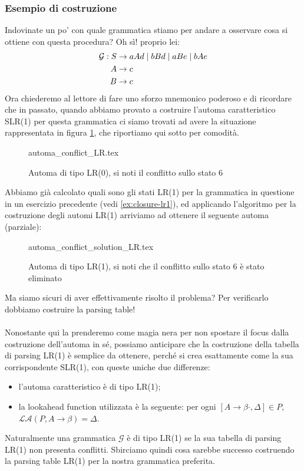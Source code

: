 \documentclass[class=book, crop=false, oneside, 12pt]{standalone}
\begin{document}
\subsubsection{Esempio di costruzione}
Indovinate un po' con quale grammatica stiamo per andare a osservare cosa si ottiene con questa procedura? Oh sì! proprio lei:
\begin{align}
    \label{eq:ex3-slr1-grammarrrrrr-again-and-again}
    \mathcal{G}: S &\to aAd \mid bBd \mid aBe \mid bAe \\
    A &\to c \nonumber \\ \notag
    B &\to c \notag
\end{align}
Ora chiederemo al lettore di fare uno sforzo mnemonico poderoso e di ricordare che in passato, quando abbiamo provato a costruire l'automa caratteristico SLR(1) per questa grammatica ci siamo trovati ad avere la situazione rappresentata in figura \ref{fig:lr0-automata_conflict_2}, che riportiamo qui sotto per comodità.
\begin{figure}[H]
    \centering
    {automa_conflict_LR.tex}
    \caption{Automa di tipo LR(0), si noti il conflitto sullo stato 6}
    \label{fig:lr0-automata_conflict_2}
\end{figure}
Abbiamo già calcolato quali sono gli stati LR(1) per la grammatica in questione in un esercizio precedente (vedi \ref{ex:closure-lr1}), ed applicando l'algoritmo per la costruzione degli automi LR(1) arriviamo ad ottenere il seguente automa (parziale):
\begin{figure}[H]
    \centering
    {automa_conflict_solution_LR.tex}
    \caption{Automa di tipo LR(1), si noti che il conflitto sullo stato 6 è stato eliminato}
    \label{fig:lr1-automata_no-conflict}
\end{figure}
Ma siamo sicuri di aver effettivamente risolto il problema? Per verificarlo dobbiamo costruire la parsing table!

\paragraph{}
Nonostante qui la prenderemo come magia nera per non spostare il focus dalla costruzione dell'automa in sé, possiamo anticipare che la costruzione della tabella di parsing LR(1) è semplice da ottenere, perché si crea esattamente come la sua corrispondente SLR(1), con queste uniche due differenze:
\begin{itemize}
    \item l'automa caratteristico è di tipo LR(1);
    \item la lookahead function utilizzata è la seguente: per ogni \([A \to \beta \cdot , \Delta] \in P\), \(\mathcal{LA}(P, A \to \beta ) = \Delta\).
\end{itemize}
Naturalmente una grammatica \(\mathcal{G}\) è di tipo LR(1) se la sua tabella di parsing LR(1) non presenta conflitti. Sbirciamo quindi cosa sarebbe successo costruendo la parsing table LR(1) per la nostra grammatica preferita.
\end{document}
